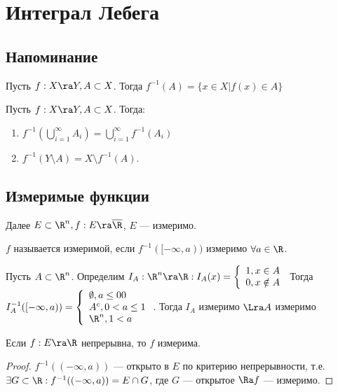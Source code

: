 \section{Интеграл Лебега}
\subsection{Напоминание}
\begin{definition}
    Пусть \(f: X \ra Y, A \subset X\). Тогда \(f^{-1}(A) = \{x \in X | f(x) \in A\}\)
\end{definition}

\begin{note}
    Пусть \(f: X \ra Y, A \subset X\). Тогда:
    \begin{enumerate}
        \item \(f^{-1}(\bigcup_{i = 1}^\infty A_i) = \bigcup_{i = 1}^\infty f^{-1}(A_i)\)
        \item \(f^{-1}(Y \setminus A) = X \setminus f^{-1}(A)\).
    \end{enumerate}    
\end{note}

\subsection{Измеримые функции}
Далее \(E \subset \R^n, f: E \ra \overline{\R}\), \(E\) --- измеримо.
\begin{definition}
    \(f\) называется измеримой, если \(f^{-1}([-\infty, a))\) измеримо \(\forall a \in \R\).
\end{definition}

\begin{example}
    Пусть \(A \subset \R^n\). Определим \(I_A: \R^n \ra \R: I_A(x) = \left\{\begin{array}{l}
        1, x \in A \\
        0, x \notin A
    \end{array}\right.\)
    Тогда \(I_A^{-1}([-\infty, a)) = \left\{\begin{array}{l}
        \emptyset, a \le 0 0 \\
        A^c, 0 < a \le 1 \\
        \R^n, 1 < a \\
    \end{array}\right.\).
    Тогда \(I_A\) измеримо \(\Lra A\) измеримо
\end{example}

\begin{proposition}
    Если \(f: E \ra \R\) непрерывна, то \(f\) измерима.
\end{proposition}
\begin{proof}
    \(f^{-1}((-\infty, a))\) --- открыто в \(E\) по критерию непрерывности, т.е. \(\exists G \subset \R: f^{-1}((-\infty, a)) = E \cap G\), где \(G\) --- открытое \(\Ra f\) --- измеримо.
\end{proof}

